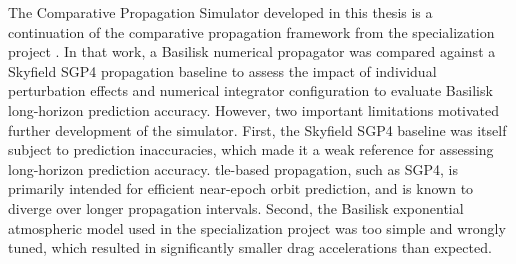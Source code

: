 The Comparative Propagation Simulator developed in this thesis is a continuation of the comparative propagation framework from the specialization project \cite{hystad2025}. In that work, a Basilisk numerical propagator was compared against a Skyfield SGP4 propagation baseline to assess the impact of individual perturbation effects and numerical integrator configuration to evaluate Basilisk long-horizon prediction accuracy. However, two important limitations motivated further development of the simulator. First, the Skyfield SGP4 baseline was itself subject to prediction inaccuracies, which made it a weak reference for assessing long-horizon prediction accuracy. \gls{tle}-based propagation, such as SGP4, is primarily intended for efficient near-epoch orbit prediction, and is known to diverge over longer propagation intervals. Second, the Basilisk exponential atmospheric model used in the specialization project was too simple and wrongly tuned, which resulted in significantly smaller drag accelerations than expected.

